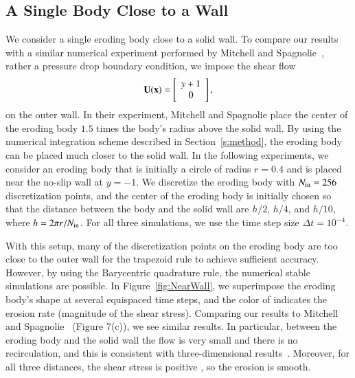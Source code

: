 \documentclass[preprint, 10pt]{elsarticle}
\begin{document}
\subsection{A Single Body Close to a Wall}
We consider a single eroding body close to a solid wall.  To compare our
results with a similar numerical experiment performed by Mitchell and
Spagnolie~\cite{mit-spa2017}, rather a pressure drop boundary condition,
we impose the shear flow
\begin{align}
  {\mathbf{U}}({\mathbf{x}})=\left[
  \begin{array}{c}
    y+1 \\ 0
  \end{array}
  \right],
\end{align}
on the outer wall.  In their experiment, Mitchell and Spagnolie place
the center of the eroding body $1.5$ times the body's radius above the
solid wall.  By using the numerical integration scheme described in
Section~\ref{s:method}, the eroding body can be placed much closer to
the solid wall.  In the following experiments, we consider an eroding
body that is initially a circle of radius $r=0.4$ and is placed near the
no-slip wall at $y=-1$.  We discretize the eroding body with
$N_{\mathrm{in}}=256$ discretization points, and the center of the eroding body
is initially chosen so that the distance between the body and the solid
wall are $h/2$, $h/4$, and $h/10$, where $h = 2\pi r/N_{\mathrm{in}}$.  For all
three simulations, we use the time step size $\Delta t=10^{-4}$.

With this setup, many of the discretization points on the eroding body
are too close to the outer wall for the trapezoid rule to achieve
sufficient accuracy.  However, by using the Barycentric quadrature rule,
the numerical stable simulations are possible.  In
Figure~\ref{fig:NearWall}, we superimpose the eroding body's shape at
several equispaced time steps, and the color of indicates the erosion
rate (magnitude of the shear stress).  Comparing our results to Mitchell
and Spagnolie~\cite{mit-spa2017} (Figure 7(c)), we see similar results.
In particular, between the eroding body and the solid wall the flow is
very small and there is no recirculation, and this is consistent with
three-dimensional results~\cite{cah-feu2002}.  Moreover, for all three
distances, the shear stress is positive , so the erosion is smooth.
\end{document}
